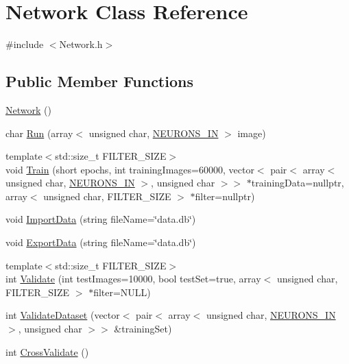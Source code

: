 \hypertarget{class_network}{}\section{Network Class Reference}
\label{class_network}


{\ttfamily \#include $<$Network.\+h$>$}

\subsection*{Public Member Functions}
\begin{DoxyCompactItemize}
\item 
\mbox{\hyperlink{class_network_a3cc2fb4f8fa4d507077e8da85ce5a1c8}{Network}} ()
\item 
char \mbox{\hyperlink{class_network_aeafe392ced0c5ec00c8f09ad9300f14d}{Run}} (array$<$ unsigned char, \mbox{\hyperlink{_constants_8h_aefc2426e4681da445c7793c98a83c532}{N\+E\+U\+R\+O\+N\+S\+\_\+\+IN}} $>$ image)
\item 
{\footnotesize template$<$std\+::size\+\_\+t F\+I\+L\+T\+E\+R\+\_\+\+S\+I\+ZE$>$ }\\void \mbox{\hyperlink{class_network_a22a9a612294363126d5fe95ba5a7c025}{Train}} (short epochs, int training\+Images=60000, vector$<$ pair$<$ array$<$ unsigned char, \mbox{\hyperlink{_constants_8h_aefc2426e4681da445c7793c98a83c532}{N\+E\+U\+R\+O\+N\+S\+\_\+\+IN}} $>$, unsigned char $>$$>$ $\ast$training\+Data=nullptr, array$<$ unsigned char, F\+I\+L\+T\+E\+R\+\_\+\+S\+I\+ZE $>$ $\ast$filter=nullptr)
\item 
void \mbox{\hyperlink{class_network_ae41cc8ad394e1e95ede281a7d7af79f7}{Import\+Data}} (string file\+Name=\char`\"{}data.\+db\char`\"{})
\item 
void \mbox{\hyperlink{class_network_a21a7dd636e2c712d3e3cd64ba4852197}{Export\+Data}} (string file\+Name=\char`\"{}data.\+db\char`\"{})
\item 
{\footnotesize template$<$std\+::size\+\_\+t F\+I\+L\+T\+E\+R\+\_\+\+S\+I\+ZE$>$ }\\int \mbox{\hyperlink{class_network_a2ba9df9c5cb54f8ea569cca6df907188}{Validate}} (int test\+Images=10000, bool test\+Set=true, array$<$ unsigned char, F\+I\+L\+T\+E\+R\+\_\+\+S\+I\+ZE $>$ $\ast$filter=N\+U\+LL)
\item 
int \mbox{\hyperlink{class_network_af90f8a3a47ea9e212ce2c5adb93f25f3}{Validate\+Dataset}} (vector$<$ pair$<$ array$<$ unsigned char, \mbox{\hyperlink{_constants_8h_aefc2426e4681da445c7793c98a83c532}{N\+E\+U\+R\+O\+N\+S\+\_\+\+IN}} $>$, unsigned char $>$$>$ \&training\+Set)
\item 
int \mbox{\hyperlink{class_network_a66fd295c613b070635e4007a097184f6}{Cross\+Validate}} ()
\end{DoxyCompactItemize}
